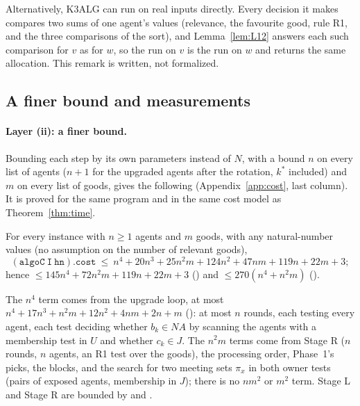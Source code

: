 \documentclass[runningheads,11pt]{llncs}
\newcommand{\NA}{\mathit{NA}}
\begin{document}
Alternatively, K3ALG can run on real inputs directly. Every decision it makes compares two sums of one agent's values (relevance, the favourite good, rule R1, and the three comparisons of the sort), and Lemma~\ref{lem:L12} answers each such comparison for $v$ as for $w$, so the run on $v$ is the run on $w$ and returns the same allocation. This remark is written, not formalized.

\subsection{A finer bound and measurements}\label{sec:finer}

\paragraph{Layer (ii): a finer bound.} Bounding each step by its own parameters instead of $N$, with a bound $n$ on every list of agents ($n+1$ for the upgraded agents after the rotation, $k^*$ included) and $m$ on every list of goods, gives the following (Appendix~\ref{app:cost}, last column). It is proved for the same program and in the same cost model as Theorem~\ref{thm:time}.

\begin{theorem}\label{thm:fine}
For every instance with $n\ge1$ agents and $m$ goods, with any natural-number values (no assumption on the number of relevant goods),
\[
  \mathtt{(algoC\ I\ hn).cost}\ \le\ n^4+20n^3+25n^2m+124n^2+47nm+119n+22m+3;
\]
hence $\le145n^4+72n^2m+119n+22m+3$ ({\upshape{}}) and $\le270(n^4+n^2m)$ ({\upshape{}}).
\end{theorem}

\noindent The $n^4$ term comes from the upgrade loop, at most $n^4+17n^3+n^2m+12n^2+4nm+2n+m$ (): at most $n$ rounds, each testing every agent, each test deciding whether $b_k\in\NA$ by scanning the agents with a membership test in $U$ and whether $c_k\in J$. The $n^2m$ terms come from Stage R ($n$ rounds, $n$ agents, an R1 test over the goods), the processing order, Phase~1's picks, the blocks, and the search for two meeting sets $\pi_x$ in both owner tests (pairs of exposed agents, membership in $J$); there is no $nm^2$ or $m^2$ term. Stage L and Stage R are bounded by  and .
\end{document}
